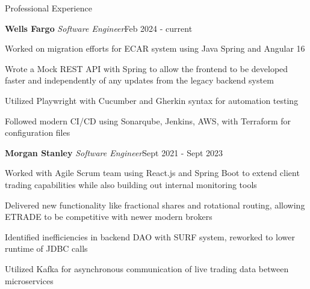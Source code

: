 \documentclass{resume} %
\begin{document}
\begin{rSection}{Professional Experience}

\vspace{2mm}

\noindent\hspace{-1.5em}\begin{rSubsection}{\textbf{\large Wells Fargo} \normalfont \em Software Engineer}{Feb 2024 - current}{}{}
\item Worked on migration efforts for ECAR system using Java Spring and Angular 16
\item Wrote a Mock REST API with Spring to allow the frontend to be developed faster and independently of any updates from the legacy backend system
\item Utilized Playwright with Cucumber and Gherkin syntax for automation testing
\item Followed modern CI/CD using Sonarqube, Jenkins, AWS, with Terraform for configuration files
\end{rSubsection}


\vspace{-1mm}
\noindent\hspace{-1.5em}\begin{rSubsection}{\textbf{\large Morgan Stanley} \normalfont \em Software Engineer}{Sept 2021 - Sept 2023}{}{}
\item Worked with Agile Scrum team using React.js and Spring Boot to extend client trading capabilities while also building out internal monitoring tools
\item Delivered new functionality like fractional shares and rotational routing, allowing ETRADE to be competitive with newer modern brokers
\item Identified inefficiencies in backend DAO with SURF system, reworked to lower runtime of JDBC calls
\item Utilized Kafka for asynchronous communication of live trading data between microservices
\end{rSubsection}


\end{rSection}
\end{document}
